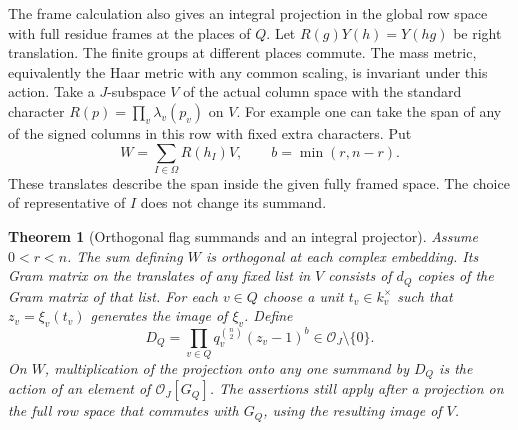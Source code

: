 \documentclass[a4paper,11pt]{article}
\newtheorem{theorem}[proposition]{Theorem}
\theoremstyle{definition}
\theoremstyle{remark}
\numberwithin{equation}{section}
\begin{document}
The frame calculation also gives an integral projection in the
global row space with full residue frames at the places of \(Q\).
Let \(R(g)Y(h)=Y(hg)\) be right translation. The finite groups
at different places commute. The mass metric, equivalently the
Haar metric with any common scaling, is invariant under this
action. Take a \(J\)-subspace \(V\) of the actual column space
with the standard character \(R(p)=\prod_v\lambda_v(p_v)\)
on \(V\). For example one can take the span of any of the signed
columns in this row with fixed extra characters. Put
\[
       W=\sum_{I\in\Omega}R(h_I)V,\qquad b=\min(r,n-r).
\]
These translates describe the span inside the given fully
framed space. The choice of representative of \(I\) does
not change its summand.

\begin{theorem}[Orthogonal flag summands and an integral projector]
\leavevmode\label{thm:flagproject383}
Assume \(0<r<n\). The sum defining \(W\) is orthogonal at
each complex embedding. Its Gram matrix on the translates
of any fixed list in \(V\) consists of \(d_Q\) copies of the
Gram matrix of that list. For each \(v\in Q\) choose a
unit \(t_v\in k_v^\times\) such that \(z_v=\xi_v(t_v)\)
generates the image of \(\xi_v\). Define
\[
    D_Q=\prod_{v\in Q}
              q_v^{\binom n2}(z_v-1)^{b}\in\mathcal O_J
              \setminus\{0\}.
\]
On \(W\), multiplication of the projection onto any one
summand by \(D_Q\) is the action of an element of
\(\mathcal O_J[G_Q]\). The assertions still apply after
a projection on the full row space that commutes with \(G_Q\),
using the resulting image of \(V\).
\end{theorem}
\end{document}
